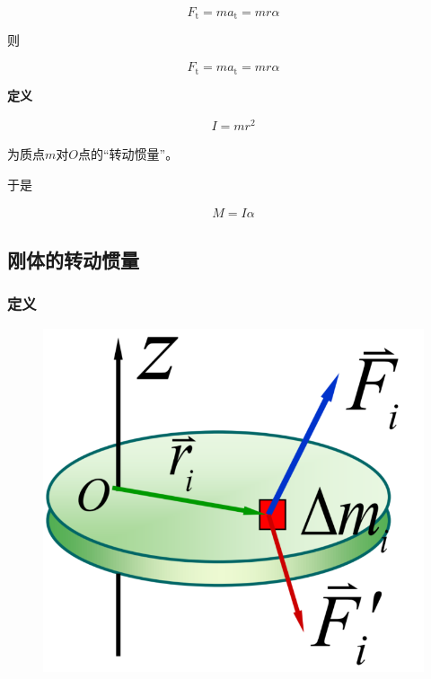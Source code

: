 \documentclass[12pt, a4paper]{article}
\numberwithin{equation}{section}
\begin{document}
    $$
        F_{\mathrm{t}}=m a_{\mathrm{t}}=m r \alpha
    $$

    则

    \begin{equation}
        F_{\mathrm{t}}=m a_{\mathrm{t}}=m r \alpha
    \end{equation}

    \textbf{定义}

    \begin{align}
        I = mr^2
    \end{align}

    为质点\(m\)对\(O\)点的“转动惯量”。

    于是

    \begin{align}
        M = I \alpha
    \end{align}

\subsection{刚体的转动惯量}

\subsubsection{定义}

    \begin{figure}
        \centering
        \includegraphics[scale=0.2]{"Chapter 04 images/pic5.png"}
        \label{pic4-5}
    \end{figure}
\end{document}
